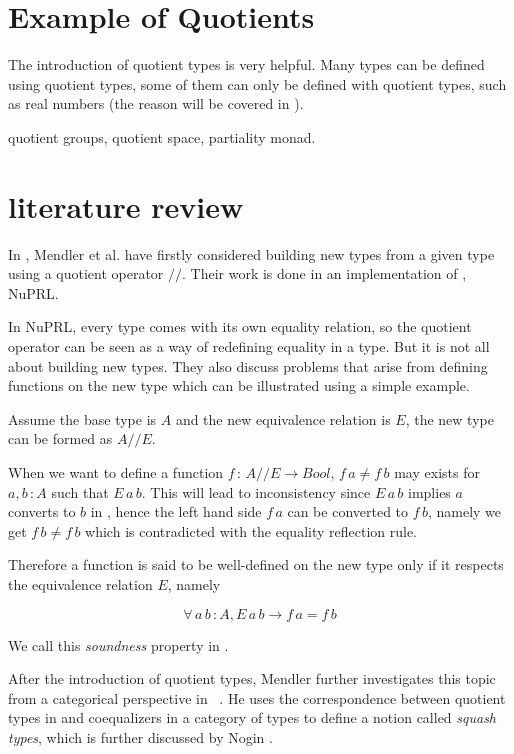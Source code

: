 \section{Example of Quotients}

The introduction of quotient types is very helpful. Many types can be
defined using quotient types, some of them can only be defined with quotient types, such as real
numbers (the reason will be covered in ).




quotient groups, quotient space, partiality monad.


\section{literature review}



In \cite{cab}, Mendler et al. have firstly considered building new types from a
given type using a quotient operator $//$. Their work is done in an
implementation of \ett, NuPRL. 

In NuPRL, every type comes with its own equality relation, so the quotient operator can be
seen as a way of redefining equality in a type. But it is not all
about building new types. They also discuss problems that arise from
defining functions on the new type which can be illustrated using a simple example. 

Assume the base type is $A$ and the new equivalence relation is $E$, the new
type can be formed as $A//E$. 

When we want to define a function $f \,\colon\, A//E \to Bool$,  $f\,a \not= f\,b$ may
exists for $a, b \,\colon A$ such that $E\,a\,b$. This will lead to
inconsistency since $E\,a\,b$ implies $a$ converts to $b$ in \ett{}, hence
the left hand side $f\,a$ can be converted to $f\,b$, namely we get $f\,b \not= f\,b$
which is contradicted with the equality reflection rule. 

Therefore a function is said to be well-defined \cite{cab} on the new type only
if it respects the equivalence relation $E$, namely

$$\forall \, a\,b\,\colon A, E\,a\,b \to f\,a = f\,b$$

We call this \emph{soundness} property in \cite{aan}.

 After the introduction of quotient types, Mendler further investigates
 this topic from a categorical perspective in ~\cite{men:90}. He uses
 the correspondence between quotient types in \mltt{} and coequalizers
 in a category of types to define a notion called \emph{squash types},
 which is further discussed by Nogin \cite{nog:02}.

